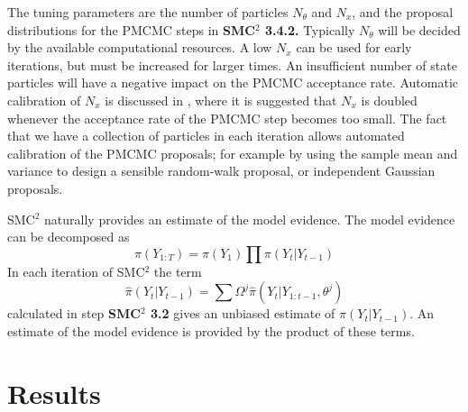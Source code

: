 \documentclass[a4paper,12pt]{article}
\begin{document}
\noindent The tuning parameters are the number of particles $N_\theta$ and $N_x$, and the proposal distributions for the PMCMC steps in {\bf SMC$^2$ 3.4.2.} Typically $N_\theta$ will be decided by the available computational resources.
A low $N_x$ can be used for early iterations, but must be increased for larger times.
An insufficient number of state particles will have a negative impact on the PMCMC acceptance rate.
Automatic calibration of $N_x$ is discussed in \cite{Chopin2012}, where it is suggested that $N_x$ is doubled whenever the acceptance rate of the PMCMC step becomes too small.
The fact that we have a collection of particles in each iteration allows automated calibration of the PMCMC proposals; for example by using the sample mean and variance to design a sensible random-walk proposal, or independent Gaussian proposals.

SMC$^2$ naturally provides an estimate of the model evidence.
The model evidence can be decomposed as 
\begin{equation}
\pi(Y_{1:T}) = \pi(Y_1) \prod \pi(Y_t \vert Y_{t-1})
\end{equation}
\noindent In each iteration of SMC$^2$ the term 
\[ \hat{\pi}(Y_t \vert Y_{t-1}) = \sum \Omega^j \hat{\pi} (Y_t \vert Y_{1:t-1}, \theta^j) \]
\noindent calculated in step {\bf SMC$^2$ 3.2} gives an unbiased estimate of $\pi(Y_t \vert Y_{t-1})$.
An estimate of the model evidence is provided by the product of these terms.

\section{Results}
\label{Sec:Results}
\end{document}
